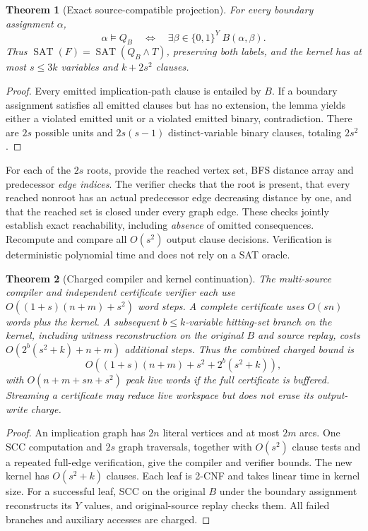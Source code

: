 \documentclass[11pt]{article}
\newtheorem{theorem}{Theorem}
\begin{document}
\begin{theorem}[Exact source-compatible projection]
For every boundary assignment $\alpha$,
\[
\alpha\models Q_B\quad\Longleftrightarrow\quad
\exists\beta\in\{0,1\}^{Y}\ B(\alpha,\beta).
\]
Thus $\operatorname{SAT}(F)=\operatorname{SAT}(Q_B\wedge T)$, preserving both labels, and the kernel has at most $s\le3k$ variables and $k+2s^2$ clauses.
\end{theorem}
\begin{proof}Every emitted implication-path clause is entailed by $B$. If a boundary assignment satisfies all emitted clauses but has no extension, the lemma yields either a violated emitted unit or a violated emitted binary, contradiction. There are $2s$ possible units and $2s(s-1)$ distinct-variable binary clauses, totaling $2s^2$.\end{proof}

For each of the $2s$ roots, provide the reached vertex set, BFS distance array and predecessor \emph{edge indices}. The verifier checks that the root is present, that every reached nonroot has an actual predecessor edge decreasing distance by one, and that the reached set is closed under every graph edge. These checks jointly establish exact reachability, including \emph{absence} of omitted consequences. Recompute and compare all $O(s^2)$ output clause decisions. Verification is deterministic polynomial time and does not rely on a SAT oracle.

\begin{theorem}[Charged compiler and kernel continuation]
The multi-source compiler and independent certificate verifier each use $O((1+s)(n+m)+s^2)$ word steps. A complete certificate uses $O(sn)$ words plus the kernel. A subsequent $b\le k$-variable hitting-set branch on the kernel, including witness reconstruction on the original $B$ and source replay, costs $O(2^b(s^2+k)+n+m)$ additional steps. Thus the combined charged bound is
\[
O((1+s)(n+m)+s^2+2^b(s^2+k)),
\]
with $O(n+m+sn+s^2)$ peak live words if the full certificate is buffered. Streaming a certificate may reduce live workspace but does not erase its output-write charge.
\end{theorem}
\begin{proof}An implication graph has $2n$ literal vertices and at most $2m$ arcs. One SCC computation and $2s$ graph traversals, together with $O(s^2)$ clause tests and a repeated full-edge verification, give the compiler and verifier bounds. The new kernel has $O(s^2+k)$ clauses. Each leaf is 2-CNF and takes linear time in kernel size. For a successful leaf, SCC on the original $B$ under the boundary assignment reconstructs its $Y$ values, and original-source replay checks them. All failed branches and auxiliary accesses are charged.\end{proof}
\end{document}
